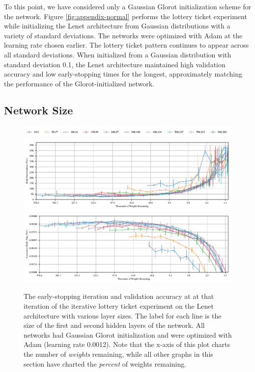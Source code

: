 To this point, we have considered only a Gaussian Glorot \citep{xavier} initialization scheme for the network.  Figure \ref{fig:appendix-normal} performs
the lottery ticket experiment while initializing the Lenet architecture from Gaussian distributions with a variety of standard deviations. The networks
were optimized with Adam at the learning rate chosen earlier. The lottery ticket pattern continues to appear across all standard deviations. When initialized
from a Gaussian distribution with standard deviation 0.1, the Lenet architecture maintained high validation accuracy and low early-stopping times for the longest,
approximately matching the performance of the Glorot-initialized network.

\subsection{Network Size}

\begin{figure}[h]
\centering
\includegraphics[width=.7\textwidth]{graphs/mnist/lenet/network_size_sweep/legend}
\includegraphics[width=\textwidth]{graphs/mnist/lenet/network_size_sweep/iteration}
\includegraphics[width=\textwidth]{graphs/mnist/lenet/network_size_sweep/accuracy}
\caption{The early-stopping iteration and validation accuracy at at that iteration of the iterative lottery ticket experiment on the Lenet
architecture with various layer sizes. The label for each line is the size of the first and second hidden layers of the network. All networks had
Gaussian Glorot initialization and were optimized with Adam (learning rate 0.0012). Note that the x-axis of this plot charts the number of \emph{weights}
remaining, while all other graphs in this section have charted the \emph{percent} of weights remaining.}
\label{fig:appendix-size}
\end{figure}

